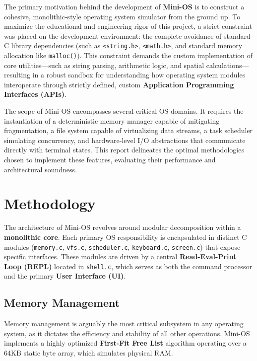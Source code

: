 \documentclass[conference]{IEEEtran}
\begin{document}
The primary motivation behind the development of \textbf{Mini-OS} is to construct a cohesive, monolithic-style operating system simulator from the ground up. To maximize the educational and engineering rigor of this project, a strict constraint was placed on the development environment: the complete avoidance of standard C library dependencies (such as \texttt{<string.h>}, \texttt{<math.h>}, and standard memory allocation like \texttt{malloc()}). This constraint demands the custom implementation of core utilities—such as string parsing, arithmetic logic, and spatial calculations—resulting in a robust sandbox for understanding how operating system modules interoperate through strictly defined, custom \textbf{Application Programming Interfaces (APIs)}.

The scope of Mini-OS encompasses several critical OS domains. It requires the instantiation of a deterministic memory manager capable of mitigating fragmentation, a file system capable of virtualizing data streams, a task scheduler simulating concurrency, and hardware-level I/O abstractions that communicate directly with terminal states. This report delineates the optimal methodologies chosen to implement these features, evaluating their performance and architectural soundness.

\section{Methodology}
The architecture of Mini-OS revolves around modular decomposition within a \textbf{monolithic core}. Each primary OS responsibility is encapsulated in distinct C modules (\texttt{memory.c}, \texttt{vfs.c}, \texttt{scheduler.c}, \texttt{keyboard.c}, \texttt{screen.c}) that expose specific interfaces. These modules are driven by a central \textbf{Read-Eval-Print Loop (REPL)} located in \texttt{shell.c}, which serves as both the command processor and the primary \textbf{User Interface (UI)}.

\subsection{Memory Management}
Memory management is arguably the most critical subsystem in any operating system, as it dictates the efficiency and stability of all other operations. Mini-OS implements a highly optimized \textbf{First-Fit Free List} algorithm operating over a 64KB static byte array, which simulates physical RAM.
\end{document}
